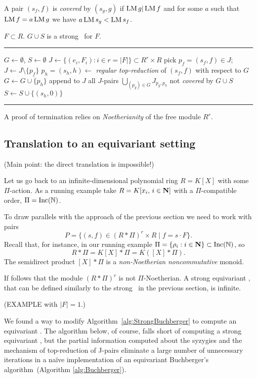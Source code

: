 A pair $(s_f,f)$ is {\em covered} by $(s_g,g)$ if $\operatorname{LM} g | \operatorname{LM} f$ and for some $a$ such that $\operatorname{LM} f = a \operatorname{LM} g$ we have $a\operatorname{LM} s_g < \operatorname{LM} s_f$. 

\begin{algorithm}[StrongBuchberger] \label{alg:StrongBuchberger}
\begin{algorithmic}[1]
\REQUIRE $F \subset R$.
\ENSURE $G \cup S$ is a strong \GB\ for $F$.
\smallskip \hrule \smallskip

\STATE $G\gets \emptyset$, $S\gets \emptyset$ 
\STATE $J\gets \{(e_i,F_i):i\in r=|F|\} \subset R^r\times R$ 
	\STATE pick $p_f = (s_f,f) \in J$; $J\gets J\setminus\{p_f\}$
	\STATE $p_h=(s_h,h) \gets$ {\em regular top-reduction} of $(s_f,f)$ with respect to $G$
		\STATE $G\gets G\cup \{p_h\}$
		\STATE append to $J$ all $J$-pairs $\bigcup_{(p_g)\in G}J_{p_g,p_h}$ not {\em covered} by $G \cup S$ 
        \ELSE 
                \STATE $S\gets S\cup\{(s_h,0)\}$
	\ENDIF
\ENDWHILE
\smallskip \hrule \smallskip
\end{algorithmic}
\end{algorithm}

A proof of termination relies on {\em Noetherianity} of the free module $R^r$. 

\subsection{Translation to an equivariant setting}
(Main point: the direct translation is impossible!)


Let us go back to an infinite-dimensional polynomial ring $R=K[X]$ with some $\Pi$-action. As a running example take $R=K[x_i,\, i\in\mathbf N]$ with a $\Pi$-compatible order, $\Pi=\operatorname{Inc}(\mathbb N)$.

To draw parallels with the approach of the previous section we need to work with pairs 
\[
P = \{(s,f)\in (R*\Pi)^r\times R \mid f=s\cdot F\}.
\]
Recall that, for instance, in our running example $\Pi=\{\rho_i:i\in\mathbf N\} \subset \operatorname{Inc}(\mathbb N)$, so \[R*\Pi = K[X]*\Pi = K([X]*\Pi).\] 
The semidirect product $[X]*\Pi$ is a {\em non-Noetherian noncommutative} monoid.

If follows that the module $(R*\Pi)^r$ is not $\Pi$-Noetherian. A strong equivariant \GB, that can be defined similarly to the strong \GB\ in the previous section, is infinite.

(EXAMPLE with $|F|=1$.)

We found a way to modify Algorithm~\ref{alg:StrongBuchberger} to compute an equivariant \GB.  The algorithm below, of course, falls short of computing a strong equivariant \GB, but the partial information computed about the syzygies and the mechanism of top-reduction of J-pairs eliminate a large number of unnecessary iterations in a na\"ive implementation of an equivariant Buchberger's algorithm~(Algorithm \ref{alg:Buchberger}).

